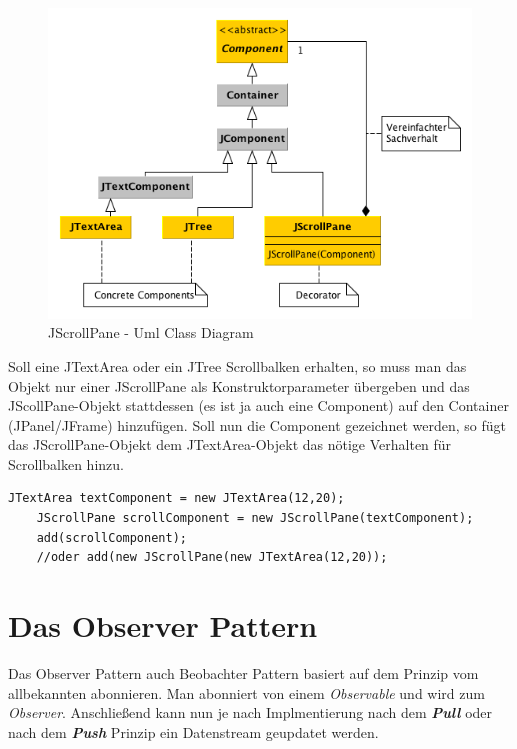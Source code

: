 	\begin{figure}[!h]
		\begin{center}
			\includegraphics[width=0.8\linewidth]{images/api-jscrollpane.png}
			\caption{JScrollPane - Uml Class Diagram \cite{pdf1}}
			\label{Decorator Pattern - Klassen Diagramm}
		\end{center}
	\end{figure}
	
	Soll eine JTextArea oder ein JTree Scrollbalken erhalten, so muss man das Objekt nur einer JScrollPane als Konstruktorparameter übergeben und das JScollPane-Objekt stattdessen (es ist ja auch eine Component) auf den Container (JPanel/JFrame) hinzufügen. Soll nun die Component gezeichnet werden, so fügt das JScrollPane-Objekt dem JTextArea-Objekt das nötige Verhalten für Scrollbalken hinzu.
	
	\begin{lstlisting}[style=JavaG, caption=Example Decorator javax.swing.JScrollPane \cite{pdf1}]
	JTextArea textComponent = new JTextArea(12,20); 
	JScrollPane scrollComponent = new JScrollPane(textComponent); 
	add(scrollComponent); 
	//oder add(new JScrollPane(new JTextArea(12,20)); 
	\end{lstlisting}


\clearpage


\section{Das Observer Pattern}
Das Observer Pattern auch Beobachter Pattern basiert auf dem Prinzip vom allbekannten abonnieren.
Man abonniert von einem \textit{Observable} und wird zum \textit{Observer}. Anschließend kann nun je nach Implmentierung nach dem \textbf{\textit{Pull}} oder nach dem \textbf{\textit{Push}} Prinzip ein Datenstream geupdatet werden.

